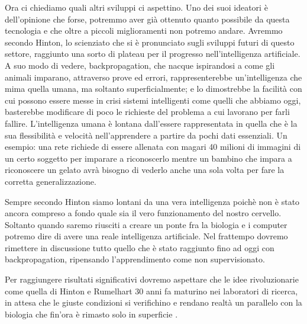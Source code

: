 \documentclass [12pt ,a4paper,openany]{book}
\begin{document}
Ora ci chiediamo quali altri sviluppi ci aspettino. Uno dei suoi ideatori è dell'opinione che forse, potremmo aver già ottenuto quanto possibile da questa tecnologia e che oltre a piccoli miglioramenti non potremo andare. Avremmo secondo Hinton, lo scienziato che si è pronunciato sugli sviluppi futuri di questo settore, raggiunto una sorto di plateau per il progresso nell'intelligenza artificiale. A suo modo di vedere, backpropagation, che nacque ispirandosi a come gli animali imparano, attraverso prove ed errori, rappresenterebbe un'intelligenza che mima quella umana, ma soltanto superficialmente; e lo dimostrebbe la facilità con cui possono essere messe in crisi sistemi intelligenti come quelli che abbiamo oggi, basterebbe modificare di poco le richieste del problema a cui lavorano per farli fallire. L'intelligenza umana è lontana dall'essere rappresentata in quella che è la sua flessibilità e velocità nell'apprendere a partire da pochi dati essenziali. Un esempio: una rete richiede di essere allenata con magari 40 milioni di immagini di un certo soggetto per imparare a riconoscerlo mentre un bambino che impara a riconoscere un gelato avrà bisogno di vederlo anche una sola volta per fare la corretta generalizzazione. 

Sempre secondo Hinton siamo lontani da una vera intelligenza poichè non è stato ancora compreso a fondo quale sia il vero funzionamento del nostro cervello. Soltanto quando saremo riusciti a creare un ponte fra la biologia e i computer potremo dire di avere una reale intelligenza artificiale. Nel frattempo dovremo rimettere in discussione tutto quello che è stato raggiunto fino ad oggi con backpropagation, ripensando l'apprendimento come non supervisionato.

Per raggiungere risultati significativi dovremo aspettare che le idee rivoluzionarie come quella di Hinton e Rumelhart 30 anni fa maturino nei laboratori di ricerca, in attesa che le giuste condizioni si verifichino e rendano realtà un parallelo con la biologia che fin'ora è rimasto solo in superficie \cite{mit-ai}. 



\end{document}
